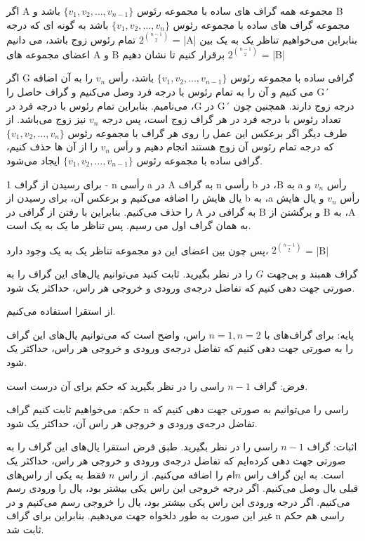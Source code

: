 \documentclass[11pt,largemargins]{h2wp}
\begin{document}
  اگر A مجموعه همه گراف های ساده با مجموعه رئوس $\{v_{1}, v_{2}, \dots, v_{n-1}\}$ باشد و B مجموعه گراف های ساده با مجموعه رئوس $\{v_{1}, v_{2}, \dots, v_{n}\}$ باشد به گونه ای که درجه تمام رئوس زوج باشد،   
    می دانیم $2^{{n-1}\choose{2}}$ = |A|
    بنابراین می‌خواهیم تناظر یک به یک بین اعضای مجموعه های A و B برقرار کنیم تا نشان دهیم
    $2^{{n-1}\choose{2}}$ = |B|
    
    اگر G گرافی ساده با مجموعه رئوس $\{v_{1}, v_{2}, \dots, v_{n-1}\}$ باشد، رأس $v_n$ را به آن اضافه می کنیم و آن را به تمام رئوس با درجه فرد وصل می‌کنیم و گراف حاصل را G´ می‌نامیم. 
    بنابراین تمام رئوس با درجه فرد در ،G در G´ درجه زوج دارند. همچنین چون تعداد رئوس با درجه فرد در هر گراف زوج است، پس درجه $v_n$ نیز زوج می‌باشد. از طرف دیگر اگر برعکس این عمل را روی هر گراف با مجموعه رئوس $\{v_{1}, v_{2}, \dots, v_{n}\}$ که درجه تمام رئوس آن زوج هستند انجام دهیم و رأس $v_n$ را از آن ها حذف کنیم، گرافی ساده با مجموعه رئوس $\{v_{1}, v_{2}, \dots, v_{n-1}\}$ ایجاد می‌شود. 
    
    برای رسیدن از گراف 1 - n رأسی a در A به گراف n رأسی b در ،B به a رأس $v_n$ و یال هایش را اضافه می‌کنیم و برعکس آن، برای رسیدن از b به ،a رأس $v_n$ و یال هایش را حذف می‌کنیم. بنابراین با رفتن از گرافی در A به گرافی در B و برگشتن از B به ،A به همان گراف اول می رسیم. پس تناظر ما یک به یک است.
 
    
    پس چون بین اعضای این دو مجموعه تناظر یک به یک وجود دارد، 
    $2^{{n-1} \choose{2}}$ = |B|
 
 \question

    گراف همبند و بی‌جهت $G$ را در نظر بگیرید. ثابت کنید می‌توانیم یال‌های این گراف را به صورتی جهت ‌دهی کنیم که تفاضل درجه‌ی ورودی و خروجی هر راس، حداکثر یک شود.

 \solution
از استقرا استفاده می‌کنیم.

پایه: برای گراف‌های با $ n = 1 , n=2 $ راس، واضح است که می‌توانیم یال‌های این گراف را به صورتی جهت ‌دهی کنیم که تفاضل درجه‌ی ورودی و خروجی هر راس، حداکثر یک شود.

فرض: گراف $n-1 $ راسی را در نظر بگیرید که حکم برای آن درست است.

حکم: می‌خواهیم ثابت کنیم گراف n راسی را می‌توانیم به صورتی جهت ‌دهی کنیم که تفاضل درجه‌ی ورودی و خروجی هر راس آن، حداکثر یک شود. 
   
   اثبات: گراف $n-1 $ راسی را در نظر بگیرید. طبق فرض استقرا یال‌های این گراف را به صورتی جهت ‌دهی کرده‌ایم که تفاضل درجه‌ی ورودی و خروجی هر راس، حداکثر یک است. به این گراف راس $ n$ام را اضافه می‌کنیم. از راس  $ n$ فقط به یکی از راس‌های قبلی یال وصل می‌کنیم. اگر درجه خروجی این راس یکی بیشتر بود، یال را ورودی رسم می‌کنیم. اگر درجه ورودی این راس یکی بیشتر بود، یال را خروجی رسم می‌کنیم و در غیر این صورت به طور دلخواه جهت می‌دهیم. 
 بنابراین برای گراف n راسی هم حکم ثابت شد.  
   \notes
   
\end{document}
